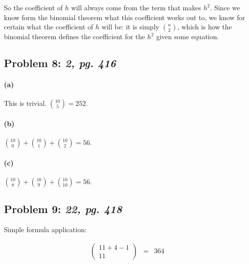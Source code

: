 \documentclass[a4paper]{article}
\begin{document}
So the coefficient of $h$ will always come from the term that makes $h^2$. Since we know form the binomial theorem what this coefficient works out to, we know for certain what the coefficient of $h$ will be: it is simply $n \choose 2$, which is how the binomial theorem defines the coefficient for the $h^2$ given some equation.

\subsection*{Problem 8: \textit{2, pg. 416}}

\paragraph{(a)} This is trivial. ${10 \choose 5} = 252$.

\paragraph{(b)} ${10 \choose 0} + {10 \choose 1} + {10 \choose 2} = 56$.

\paragraph{(c)} ${10 \choose 8} + {10 \choose 9} + {10 \choose 10} = 56$.

\subsection*{Problem 9: \textit{22, pg. 418}} Simple formula application:

\begin{equation}
\begin{array}{rll}
\left ( \begin{array}{c} 11 + 4 - 1 \\ 11 \end{array} \right ) & = & 364 \\[.15in]
\end{array}
\end{equation}
\end{document}
